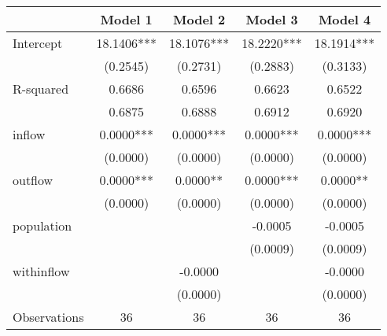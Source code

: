 \begin{table}
\caption{}
\begin{center}
\begin{tabular}{lcccc}
\hline
             &  Model 1   &  Model 2   &  Model 3   &  Model 4    \\
\midrule
Intercept    & 18.1406*** & 18.1076*** & 18.2220*** & 18.1914***  \\
             & (0.2545)   & (0.2731)   & (0.2883)   & (0.3133)    \\
R-squared    & 0.6686     & 0.6596     & 0.6623     & 0.6522      \\
             & 0.6875     & 0.6888     & 0.6912     & 0.6920      \\
inflow       & 0.0000***  & 0.0000***  & 0.0000***  & 0.0000***   \\
             & (0.0000)   & (0.0000)   & (0.0000)   & (0.0000)    \\
outflow      & 0.0000***  & 0.0000**   & 0.0000***  & 0.0000**    \\
             & (0.0000)   & (0.0000)   & (0.0000)   & (0.0000)    \\
population   &            &            & -0.0005    & -0.0005     \\
             &            &            & (0.0009)   & (0.0009)    \\
withinflow   &            & -0.0000    &            & -0.0000     \\
             &            & (0.0000)   &            & (0.0000)    \\
Observations & 36         & 36         & 36         & 36          \\
\hline
\end{tabular}
\end{center}
\end{table}